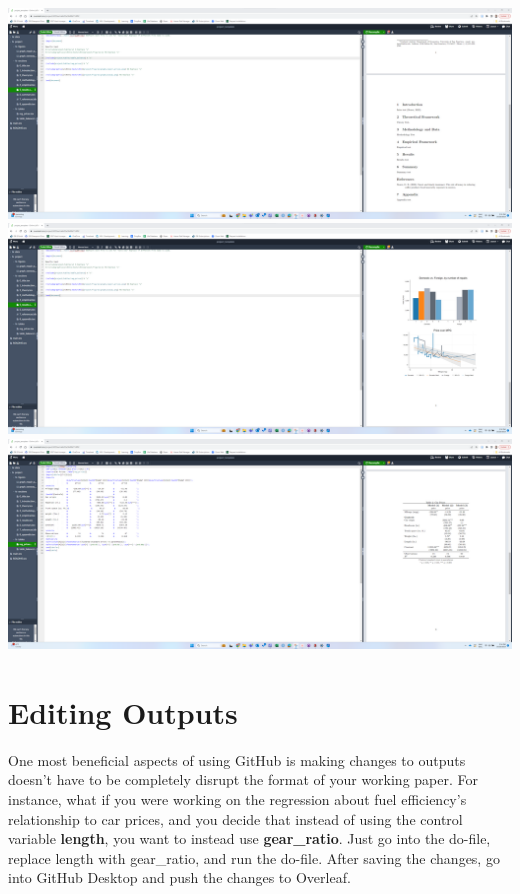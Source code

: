 \documentclass[12pt]{article}
\begin{document}
\includegraphics[width=1\textwidth]{Instructions/project_template_screenshots/project_template_18.png} \\

\includegraphics[width=1\textwidth]{Instructions/project_template_screenshots/project_template_19.png} \\

\includegraphics[width=1\textwidth]{Instructions/project_template_screenshots/project_template_20.png} \\

\section{Editing Outputs}

One most beneficial aspects of using GitHub is making changes to outputs doesn't have to be completely disrupt the format of your working paper. For instance, what if you were working on the regression about fuel efficiency's relationship to car prices, and you decide that instead of using the control variable \textbf{length}, you want to instead use \textbf{gear\_ratio}. Just go into the do-file, replace length with gear\_ratio, and run the do-file. After saving the changes, go into GitHub Desktop and push the changes to Overleaf. \\
\end{document}
